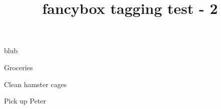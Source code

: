\documentclass{article}
\title{fancybox tagging test - 2}
\begin{document}
\begin{Bcenter} %
blub
\end{Bcenter}

\begin{Bitemize} %
\item Groceries
\item Clean hamster cages
\item Pick up Peter
\end{Bitemize}
\end{document}
